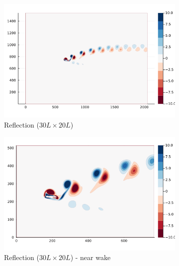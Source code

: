 \documentclass[preprint,12pt]{elsarticle}
\begin{document}
\begin{figure}
    \centering
    \begin{subfigure}{.48\textwidth}
        \centering
        \includegraphics[trim={2.8cm 2cm 4cm 2cm},clip,width=\textwidth]{tex//fig/Deflected_wake_snap.png}
        \caption{Reflection ($30L\times20L$)}
    \end{subfigure}%
    \hspace{0.1cm}
    \begin{subfigure}{.48\textwidth}
        \centering
        \includegraphics[trim={2.8cm 2cm 4cm 2cm},clip,width=\textwidth]{tex/fig/Deflected_wake_snap_small.png}
        \caption{Reflection ($30L\times20L$) - near wake}
    \end{subfigure}
    \begin{subfigure}{.48\textwidth}
        \centering

\end{subfigure}
\end{figure}
\end{document}

